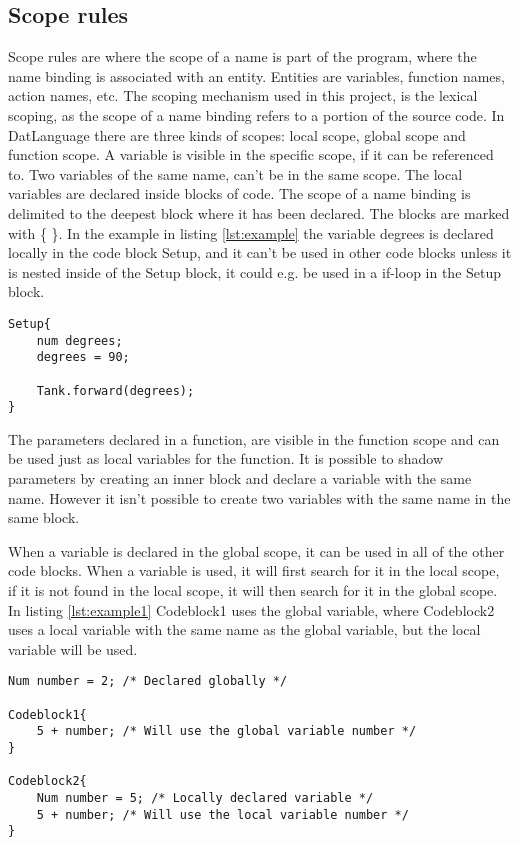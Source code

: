 \subsection{Scope rules}
Scope rules are where the scope of a name is part of the program, where the name binding is associated with an entity. Entities are variables, function names, action names, etc. The scoping mechanism used in this project, is the lexical scoping, as the scope of a name binding refers to a portion of the source code. In DatLanguage there are three kinds of scopes: local scope, global scope and function scope. A variable is visible in the specific scope, if it can be referenced to. Two variables of the same name, can't be in the same scope. The local variables are declared inside blocks of code. The scope of a name binding is delimited to the deepest block where it has been declared. The blocks are marked with \{ \}. In the example in listing \ref{lst:example} the variable degrees is declared locally in the code block Setup, and it can't be used in other code blocks unless it is nested inside of the Setup block, it could e.g. be used in a if-loop in the Setup block. 

\begin{lstlisting}[caption={Example of local scoping rules},  xleftmargin=.2\textwidth, label={lst:example}]
Setup{
	num degrees;
	degrees = 90;
	
	Tank.forward(degrees);
}
\end{lstlisting}

The parameters declared in a function, are visible in the function scope and can be used just as local variables for the function. It is possible to shadow parameters by creating an inner block and declare a variable with the same name. However it isn't possible to create two variables with the same name in the same block. 

When a variable is declared in the global scope, it can be used in all of the other code blocks. When a variable is used, it will first search for it in the local scope, if it is not found in the local scope, it will then search for it in the global scope. In listing \ref{lst:example1} Codeblock1 uses the global variable, where Codeblock2 uses a local variable with the same name as the global variable, but the local variable will be used.


\begin{lstlisting}[caption={Example of global scoping rules},  xleftmargin=.2\textwidth, label={lst:example1}]
Num number = 2; /* Declared globally */

Codeblock1{
	5 + number; /* Will use the global variable number */
}

Codeblock2{
	Num number = 5; /* Locally declared variable */
	5 + number; /* Will use the local variable number */
}
\end{lstlisting}







